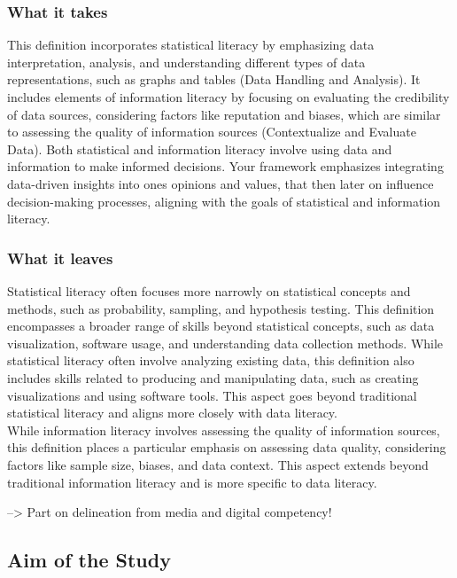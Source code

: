 \documentclass[
  12pt,
  a4paper,
  twoside]{article}
\begin{document}
\hypertarget{what-it-takes}{%
\subsubsection{What it takes}\label{what-it-takes}}

This definition incorporates statistical literacy by emphasizing data interpretation, analysis, and understanding different types of data representations, such as graphs and tables (Data Handling and Analysis). It includes elements of information literacy by focusing on evaluating the credibility of data sources, considering factors like reputation and biases, which are similar to assessing the quality of information sources (Contextualize and Evaluate Data).
Both statistical and information literacy involve using data and information to make informed decisions. Your framework emphasizes integrating data-driven insights into ones opinions and values, that then later on influence decision-making processes, aligning with the goals of statistical and information literacy.

\hypertarget{what-it-leaves}{%
\subsubsection{What it leaves}\label{what-it-leaves}}

Statistical literacy often focuses more narrowly on statistical concepts and methods, such as probability, sampling, and hypothesis testing. This definition encompasses a broader range of skills beyond statistical concepts, such as data visualization, software usage, and understanding data collection methods. While statistical literacy often involve analyzing existing data, this definition also includes skills related to producing and manipulating data, such as creating visualizations and using software tools. This aspect goes beyond traditional statistical literacy and aligns more closely with data literacy.\\
While information literacy involves assessing the quality of information sources, this definition places a particular emphasis on assessing data quality, considering factors like sample size, biases, and data context. This aspect extends beyond traditional information literacy and is more specific to data literacy.

--\textgreater{} Part on delineation from media and digital competency!

\hypertarget{aim-of-the-study}{%
\subsection{Aim of the Study}\label{aim-of-the-study}}
\end{document}
